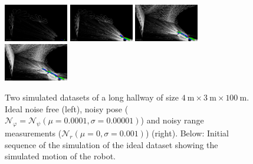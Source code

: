 \begin{figure}
	\includegraphics[width=0.25\textwidth]{images/sim_frame_00.png}\hfill
	\includegraphics[width=0.25\textwidth]{images/sim_frame_02.png}\hfill
	\includegraphics[width=0.25\textwidth]{images/sim_frame_06.png}\hfill
	\includegraphics[width=0.25\textwidth]{images/sim_frame_08.png}
	\caption{Two simulated datasets of a long hallway of size $\SI{4}{\meter}\times\SI{3}{\meter}\times\SI{100}{\meter}$. Ideal noise free (left), noisy pose ($\mathcal{N}_\varphi = \mathcal{N}_\psi(\mu = 0.0001, \sigma= 0.00001)$) and noisy range measurements ($\mathcal{N}_r(\mu = 0, \sigma = 0.001)$) (right). Below: Initial sequence of the simulation of the ideal dataset showing the simulated motion of the robot.}
	\label{fig:simulatedDatasets}
\end{figure}
